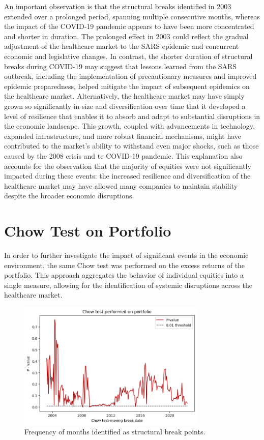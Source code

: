 An important observation is that the structural breaks identified in 2003 extended over a prolonged period, spanning multiple
consecutive months, whereas the impact of the COVID-19 pandemic appears to have been more concentrated and shorter in duration.
The prolonged effect in 2003 could reflect the gradual adjustment of the healthcare market to the SARS epidemic and concurrent
economic and legislative changes.
In contrast, the shorter duration of structural breaks during COVID-19 may suggest that lessons learned from the SARS outbreak,
including the implementation of precautionary measures and improved epidemic preparedness, helped mitigate the impact of
subsequent epidemics on the healthcare market.
Alternatively, the healthcare market may have simply grown so significantly in size and diversification over time that it 
developed a level of resilience that enables it to absorb and adapt to substantial disruptions in the economic landscape.
This growth, coupled with advancements in technology, expanded infrastructure, and more robust financial mechanisms,
might have contributed to the market's ability to withstand even major shocks, such as those caused by the 2008 crisis and
te COVID-19 pandemic.
This explanation also accounts for the observation that the majority of equities were not significantly impacted during these
events: the increased resilience and diversification of the healthcare market may have allowed many companies to maintain
stability despite the broader economic disruptions.

\section{Chow Test on Portfolio}

In order to further investigate the impact of significant events in the economic environment, the same Chow test was 
performed on the excess returns of the portfolio. 
This approach aggregates the behavior of individual equities into a single measure, allowing for the identification of 
systemic disruptions across the healthcare market.

\begin{figure}[h!]
    \centering
    \includegraphics[width=0.8\textwidth]{images/portchowlio.png}
    \caption{Frequency of months identified as structural break points.}\label{fig:portchowlio}
\end{figure}

